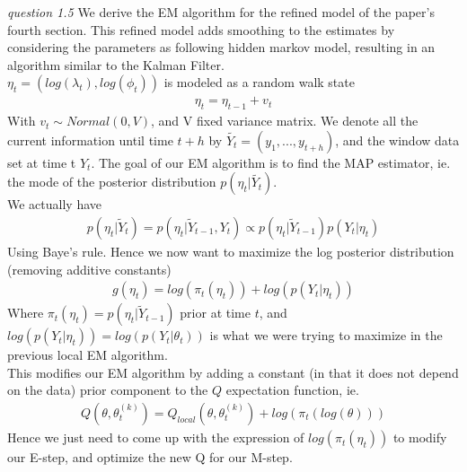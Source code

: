 \documentclass[twoside]{article}
\begin{document}
\vspace{.2 in}
\textit{question 1.5} We derive the EM algorithm for the refined model of the paper's fourth section. This refined model adds smoothing to the estimates by considering the parameters as following hidden markov model, resulting in an algorithm similar to the Kalman Filter.\\

$\eta_t = (log(\lambda_t), log(\phi_t))$ is modeled as a random walk state
\begin{align*}
\eta_t = \eta_{t - 1} + v_t
\end{align*} 
With $v_t \sim Normal(0, V)$, and V fixed variance matrix. We denote all the current information until time $t + h$ by $\tilde{Y_{t}} = (y_1, ..., y_{t + h})$, and the window data set at time t $Y_t$. The goal of our EM algorithm is to find the MAP estimator, ie. the mode of the posterior distribution $p(\eta_t | \tilde{Y_{t}})$.\\

We actually have
\begin{align*}
p(\eta_t | \tilde{Y}_{t}) = p(\eta_t | \tilde{Y}_{t - 1}, Y_t) \propto p(\eta_t | \tilde{Y}_{t - 1}) p(Y_t | \eta_t)
\end{align*}
Using Baye's rule. Hence we now want to maximize the log posterior distribution (removing additive constants)
\begin{align*}
g(\eta_t) = log\left(\pi_t(\eta_t)\right) + log\left(p(Y_t | \eta_t)\right)
\end{align*}
Where $\pi_t(\eta_t) = p(\eta_t | \tilde{Y}_{t - 1})$ prior at time $t$, and $log\left(p(Y_t | \eta_t)\right) = log\left(p(Y_t | \theta_t)\right)$ is what we were trying to maximize in the previous local EM algorithm.\\

This modifies our EM algorithm by adding a constant (in that it does not depend on the data) prior component to the $Q$ expectation function, ie.
\begin{align*}
Q(\theta, \theta_t^{(k)}) = Q_{local}(\theta, \theta_t^{(k)}) + log\left(\pi_t(log(\theta))\right)
\end{align*}
Hence we just need to come up with the expression of $log\left(\pi_t(\eta_t)\right)$ to modify our E-step, and optimize the new Q for our M-step.\\
\end{document}
